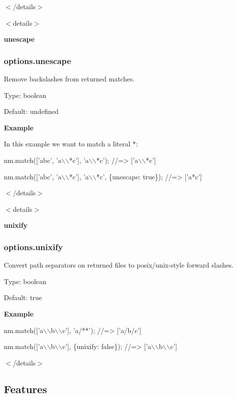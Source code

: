 $<$/details$>$

$<$details$>$ 

{\bfseries unescape}

\subsubsection*{options.\+unescape}

Remove backslashes from returned matches.

Type\+: {\ttfamily boolean}

Default\+: {\ttfamily undefined}

{\bfseries Example}

In this example we want to match a literal {\ttfamily $\ast$}\+:


\begin{DoxyCode}
nm.match(['abc', 'a\(\backslash\)\(\backslash\)*c'], 'a\(\backslash\)\(\backslash\)*c');
//=> ['a\(\backslash\)\(\backslash\)*c']

nm.match(['abc', 'a\(\backslash\)\(\backslash\)*c'], 'a\(\backslash\)\(\backslash\)*c', \{unescape: true\});
//=> ['a*c']
\end{DoxyCode}


$<$/details$>$

$<$details$>$ 

{\bfseries unixify}

\subsubsection*{options.\+unixify}

Convert path separators on returned files to posix/unix-\/style forward slashes.

Type\+: {\ttfamily boolean}

Default\+: {\ttfamily true}

{\bfseries Example}


\begin{DoxyCode}
nm.match(['a\(\backslash\)\(\backslash\)b\(\backslash\)\(\backslash\)c'], 'a/**');
//=> ['a/b/c']

nm.match(['a\(\backslash\)\(\backslash\)b\(\backslash\)\(\backslash\)c'], \{unixify: false\});
//=> ['a\(\backslash\)\(\backslash\)b\(\backslash\)\(\backslash\)c']
\end{DoxyCode}


$<$/details$>$

\subsection*{Features}

